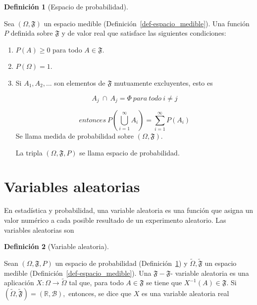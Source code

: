 \documentclass[
  us-letterpaper,
]{scrreprt}
\theoremstyle{plain}
\theoremstyle{plain}
\theoremstyle{definition}
\newtheorem{definition}{Definición}[chapter]
\theoremstyle{remark}
\begin{document}
\begin{definition}[Espacio de
probabilidad]\protect\hypertarget{def-espacio_probabilidad}{}\label{def-espacio_probabilidad}

Sea \((\Omega, \mathfrak{F})\) un espacio medible
(Definición~\ref{def-espacio_medible}). Una función \(P\) definida sobre
\(\mathfrak{F}\) y de valor real que satisface las siguientes
condiciones:

\begin{enumerate}
\def\labelenumi{\roman{enumi}.}
\item
  \(P(A) \geq 0\) para todo \(A \in \mathfrak{F}\).
\item
  \(P(\Omega) = 1\).
\item
  Si \(A_1, A_2, ...\) son elementos de \(\mathfrak{F}\) mutuamente
  excluyentes, esto es

  \[
  A_j \ \cap \ A_j = \Phi \ para \  todo \ i \neq j 
  \]

  \[
  entonces \ P \left( \bigcup_{i=1}^{\infty} A_i\right) = \sum_{i=1}^{\infty} P(A_i)
  \]Se llama medida de probabilidad sobre \((\Omega, \mathfrak{F})\).

  La tripla \((\Omega, \mathfrak{F}, P)\) se llama espacio de
  probabilidad.
\end{enumerate}

\end{definition}

\section{Variables aleatorias}\label{variables-aleatorias}

En estadística y probabilidad, una variable aleatoria es una función que
asigna un valor numérico a cada posible resultado de un experimento
aleatorio. Las variables aleatorias son

\begin{definition}[Variable
aleatoria]\protect\hypertarget{def-variable_aleatoria}{}\label{def-variable_aleatoria}

Sean \((\Omega,\mathfrak{F}, P)\) un espacio de probabilidad
(Definición~\ref{def-espacio_probabilidad}) y
\(\tilde{\Omega},\tilde{\mathfrak{F}}\) un espacio medible
(Definición~\ref{def-espacio_medible}). Una
\(\mathfrak{F}-\mathfrak{F}\)- variable aleatoria es una aplicación
\(X:\Omega\rightarrow \tilde{\Omega}\) tal que, para todo
\(A \in \mathfrak{F}\) se tiene que \(X^{-1}(A) \in  \mathfrak{F}\). Si
\((\tilde{\Omega}, \tilde{\mathfrak{F}}) = (\mathbb{R},\mathcal{B}),\)
entonces, se dice que \(X\) es una variable aleatoria real

\end{definition}
\end{document}

